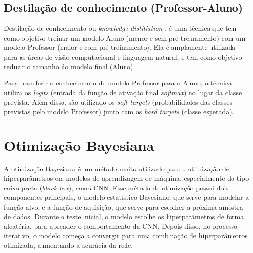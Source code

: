 \subsection{Destilação de conhecimento (Professor-Aluno)}\label{conceitos_destilacao}

Destilação de conhecimento ou \textit{knowledge distillation} \cite{hinton2015distilling}, é uma técnica que tem
como objetivo treinar um modelo Aluno (menor e sem pré-treinamento) com um modelo Professor
(maior e com pré-treinamento). Ela é amplamente utilizada para as áreas de visão computacional e linguagem natural,
e tem como objetivo reduzir o tamanho do modelo final (Aluno).

Para transferir o conhecimento do modelo Professor para o Aluno, a técnica utiliza os \textit{logits} (entrada da
função de ativação final \textit{softmax}) no lugar da classe prevista. Além disso, são utilizado os
\textit{soft targets} (probabilidades das classes previstas pelo modelo Professor) junto com os
\textit{hard targets} (classe esperada).


\section{Otimização Bayesiana}\label{cap_conceitos_bayesiana}
A otimização Bayesiana é um método muito utilizado para a otimização de hiperparâmetros em modelos de aprendizagem de
máquina, especialmente do tipo caixa preta (\textit{black box}), como CNN.
Esse método de otimização possui dois componentes principais, o modelo estatístico Bayesiano, que serve para modelar a
função alvo, e a função de aquisição, que serve para escolher a próxima amostra de dados. \cite{frazier2018tutorial}
Durante o teste inicial, o modelo escolhe os hiperparâmetros de forma aleatória, para aprender o comportamento da CNN.
Depois disso, no processo iterativo, o modelo começa a convergir para uma combinação de hiperparâmetros otimizada,
aumentando a acurácia da rede.


